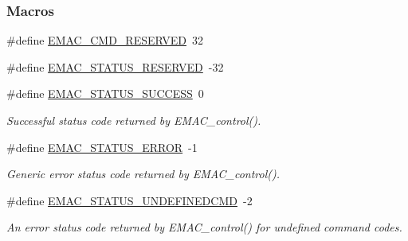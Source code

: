 \subsubsection*{Macros}
\begin{DoxyCompactItemize}
\item 
\#define \hyperlink{group___e_m_a_c___c_o_n_t_r_o_l_ga56f3e93517d362f44d638f1e7ecbcfdb}{E\+M\+A\+C\+\_\+\+C\+M\+D\+\_\+\+R\+E\+S\+E\+R\+V\+E\+D}~32
\item 
\#define \hyperlink{group___e_m_a_c___c_o_n_t_r_o_l_gada65346f7e4d230ac1998870744f6161}{E\+M\+A\+C\+\_\+\+S\+T\+A\+T\+U\+S\+\_\+\+R\+E\+S\+E\+R\+V\+E\+D}~-\/32
\item 
\#define \hyperlink{group___e_m_a_c___s_t_a_t_u_s_ga335affc31a69a1af1f5ea215936d60f7}{E\+M\+A\+C\+\_\+\+S\+T\+A\+T\+U\+S\+\_\+\+S\+U\+C\+C\+E\+S\+S}~0
\begin{DoxyCompactList}\small\item\em Successful status code returned by E\+M\+A\+C\+\_\+control(). \end{DoxyCompactList}\item 
\#define \hyperlink{group___e_m_a_c___s_t_a_t_u_s_gac1c4139ae6d9551aa60f3af3ea6fc519}{E\+M\+A\+C\+\_\+\+S\+T\+A\+T\+U\+S\+\_\+\+E\+R\+R\+O\+R}~-\/1
\begin{DoxyCompactList}\small\item\em Generic error status code returned by E\+M\+A\+C\+\_\+control(). \end{DoxyCompactList}\item 
\#define \hyperlink{group___e_m_a_c___s_t_a_t_u_s_gade69656b299f95b8286b4d39e6ee10da}{E\+M\+A\+C\+\_\+\+S\+T\+A\+T\+U\+S\+\_\+\+U\+N\+D\+E\+F\+I\+N\+E\+D\+C\+M\+D}~-\/2
\begin{DoxyCompactList}\small\item\em An error status code returned by E\+M\+A\+C\+\_\+control() for undefined command codes. \end{DoxyCompactList}\end{DoxyCompactItemize}
